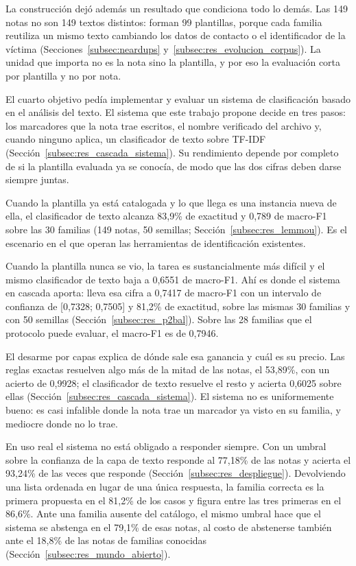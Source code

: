 La construcción dejó además un resultado que condiciona todo lo demás. Las 149 notas no son 149 textos distintos: forman 99 plantillas, porque cada familia reutiliza un mismo texto cambiando los datos de contacto o el identificador de la víctima (Secciones~\ref{subsec:neardups} y~\ref{subsec:res_evolucion_corpus}). La unidad que importa no es la nota sino la plantilla, y por eso la evaluación corta por plantilla y no por nota.

El cuarto objetivo pedía implementar y evaluar un sistema de clasificación basado en el análisis del texto. El sistema que este trabajo propone decide en tres pasos: los marcadores que la nota trae escritos, el nombre verificado del archivo y, cuando ninguno aplica, un clasificador de texto sobre TF-IDF (Sección~\ref{subsec:res_cascada_sistema}). Su rendimiento depende por completo de si la plantilla evaluada ya se conocía, de modo que las dos cifras deben darse siempre juntas.

Cuando la plantilla ya está catalogada y lo que llega es una instancia nueva de ella, el clasificador de texto alcanza 83,9\% de exactitud y 0,789 de macro-F1 sobre las 30 familias (149 notas, 50 semillas; Sección~\ref{subsec:res_lemmou}). Es el escenario en el que operan las herramientas de identificación existentes.

Cuando la plantilla nunca se vio, la tarea es sustancialmente más difícil y el mismo clasificador de texto baja a 0,6551 de macro-F1. Ahí es donde el sistema en cascada aporta: lleva esa cifra a 0,7417 de macro-F1 con un intervalo de confianza de [0,7328; 0,7505] y 81,2\% de exactitud, sobre las mismas 30 familias y con 50 semillas (Sección~\ref{subsec:res_p2bal}). Sobre las 28 familias que el protocolo puede evaluar, el macro-F1 es de 0,7946.

El desarme por capas explica de dónde sale esa ganancia y cuál es su precio. Las reglas exactas resuelven algo más de la mitad de las notas, el 53,89\%, con un acierto de 0,9928; el clasificador de texto resuelve el resto y acierta 0,6025 sobre ellas (Sección~\ref{subsec:res_cascada_sistema}). El sistema no es uniformemente bueno: es casi infalible donde la nota trae un marcador ya visto en su familia, y mediocre donde no lo trae.

En uso real el sistema no está obligado a responder siempre. Con un umbral sobre la confianza de la capa de texto responde al 77,18\% de las notas y acierta el 93,24\% de las veces que responde (Sección~\ref{subsec:res_despliegue}). Devolviendo una lista ordenada en lugar de una única respuesta, la familia correcta es la primera propuesta en el 81,2\% de los casos y figura entre las tres primeras en el 86,6\%. Ante una familia ausente del catálogo, el mismo umbral hace que el sistema se abstenga en el 79,1\% de esas notas, al costo de abstenerse también ante el 18,8\% de las notas de familias conocidas (Sección~\ref{subsec:res_mundo_abierto}).

